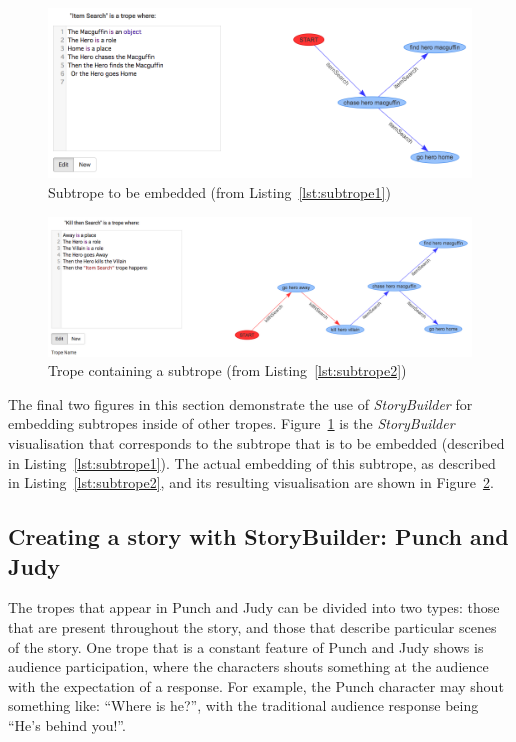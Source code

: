 \documentclass[11pt]{report}
\begin{document}
\begin{figure}[!h]
\centerline{\includegraphics[width=\textwidth]{storybuilder-subtrope1.png}}
\caption{Subtrope to be embedded (from Listing~\ref{lst:subtrope1})}\label{fig:sb-subtrope1}
\end{figure}

\begin{figure}[!h]
\centerline{\includegraphics[width=\textwidth]{storybuilder-subtrope2.png}}
\caption{Trope containing a subtrope (from Listing~\ref{lst:subtrope2})}\label{fig:sb-subtrope2}
\end{figure}

The final two figures in this section demonstrate the use of \emph{StoryBuilder}
for embedding subtropes inside of other tropes. Figure~\ref{fig:sb-subtrope1} is
the \emph{StoryBuilder} visualisation that corresponds to the subtrope that is
to be embedded (described in Listing~\ref{lst:subtrope1}). The actual embedding
of this subtrope, as described in Listing~\ref{lst:subtrope2}, and its resulting visualisation are shown in Figure~\ref{fig:sb-subtrope2}.

\subsection{Creating a story with StoryBuilder: Punch and Judy}

The tropes that appear in Punch and Judy can be divided into two types: those
that are present throughout the story, and those that describe particular scenes
of the story. One trope that is a constant feature of Punch and Judy shows is
audience participation, where the characters shouts something at the audience
with the expectation of a response. For example, the Punch character may shout
something like: ``Where is he?'', with the traditional audience response being
``He's behind you!''.
\end{document}

